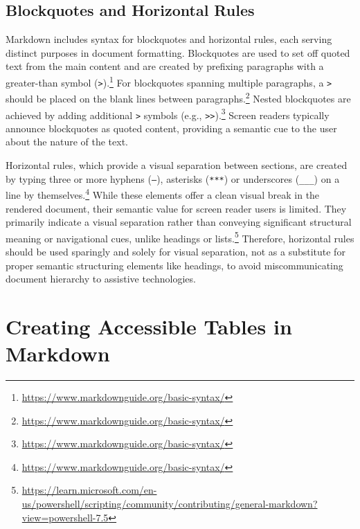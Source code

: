 \subsection{Blockquotes and Horizontal Rules}
Markdown includes syntax for blockquotes and horizontal rules, each serving distinct purposes in document formatting. Blockquotes are used to set off quoted text from the main content and are created by prefixing paragraphs with a greater-than symbol (\texttt{>}).\footnote{\url{https://www.markdownguide.org/basic-syntax/}} For blockquotes spanning multiple paragraphs, a \texttt{>} should be placed on the blank lines between paragraphs.\footnote{\url{https://www.markdownguide.org/basic-syntax/}} Nested blockquotes are achieved by adding additional \texttt{>} symbols (e.g., \texttt{>>}).\footnote{\url{https://www.markdownguide.org/basic-syntax/}} Screen readers typically announce blockquotes as quoted content, providing a semantic cue to the user about the nature of the text.

Horizontal rules, which provide a visual separation between sections, are created by typing three or more hyphens (\texttt{---}), asterisks (\texttt{***}) or underscores (\texttt{\_\_\_}) on a line by themselves.\footnote{\url{https://www.markdownguide.org/basic-syntax/}} While these elements offer a clean visual break in the rendered document, their semantic value for screen reader users is limited. They primarily indicate a visual separation rather than conveying significant structural meaning or navigational cues, unlike headings or lists.\footnote{\url{https://learn.microsoft.com/en-us/powershell/scripting/community/contributing/general-markdown?view=powershell-7.5}} Therefore, horizontal rules should be used sparingly and solely for visual separation, not as a substitute for proper semantic structuring elements like headings, to avoid miscommunicating document hierarchy to assistive technologies.

\section{Creating Accessible Tables in Markdown}

